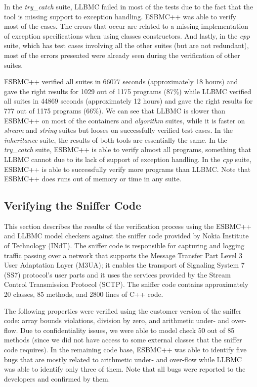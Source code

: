 \documentclass[conference]{IEEEtran}
\begin{document}
In the \textit{try\_catch} suite, LLBMC failed in most of the tests due to the fact that
the tool is missing support to exception handling. ESBMC++ was able to verify most of the cases.
The errors that occur are related to a missing implementation of exception specifications when
using classes constructors. And lastly, in the \textit{cpp} suite, which has test cases involving all
the other suites (but are not redundant), most of the errors presented were already seen during
the verification of other suites.

ESBMC++ verified all suites in 66077 seconds (approximately 18 hours)
and gave the right results for 1029 out of 1175 programs (87\%) while LLBMC verified all suites
in 44869 seconds (approximately 12 hours) and gave the right results for 777 out of 1175 programs
(66\%). We can see that LLBMC is slower than ESBMC++ on most of the containers
and \textit{algorithm} suites, while it is faster on \textit{stream} and
\textit{string} suites but looses on successfully verified test cases.
In the \textit{inheritance} suite, the results of both tools are essentially the same.
In the \textit{try\_catch} suite, ESBMC++ is able to verify almost all programs,
something that LLBMC cannot due to its lack of support of exception handling.
In the \textit{cpp} suite, ESBMC++ is able to successfully verify more programs than LLBMC.
Note that ESBMC++ does runs out of memory or time in any suite.

\subsection{Verifying the Sniffer Code}
\label{verifying-the-sniffer-code}

This section describes the results of the verification process using the
ESBMC++ and LLBMC model checkers against the sniffer code provided by
Nokia Institute of Technology (INdT). The sniffer code is responsible for
capturing and logging traffic passing over a network that supports the Message
Transfer Part Level 3 User Adaptation Layer (M3UA); it enables the transport of
Signaling System 7 (SS7) protocol's user parts and it uses the services provided
by the Stream Control Transmission Protocol (SCTP). The sniffer code contains
approximately 20 classes, 85 methods, and 2800 lines of C++ code.

The following properties were verified using the customer version
of the sniffer code: array bounds violations, division by zero, and arithmetic under-
and over-flow. Due to confidentiality issues, we were able to model check
50 out of 85 methods (since we did not have access to some external classes that
the sniffer code requires). In the remaining code base, ESBMC++ was able to identify five bugs
that are mostly related to arithmetic under- and over-flow while LLBMC was able to
identify only three of them. Note that all bugs were reported to the developers
and confirmed by them.
\end{document}
